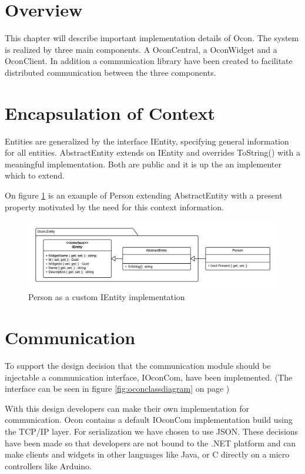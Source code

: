 \documentclass[../report.tex]{subfiles}
\begin{document}
\graphicspath{{img/}{../img/}}

\section{Overview}
This chapter will describe important implementation details of Ocon. The system is realized by three main components. A OconCentral, a OconWidget and a OconClient. In addition a communication library have been created to facilitate distributed communication between the three components.


\section{Encapsulation of Context}

Entities are generalized by the interface IEntity, specifying general information for all entities. AbstractEntity extends on IEntity and overrides ToString() with a meaningful implementation. Both are public and it is up the an implementer which to extend.

On figure \ref{fig:PersonImplementation} is an example of Person extending AbstractEntity with a present property motivated by the need for this context information.


\begin{figure}[H]
\includegraphics[width=\linewidth]{customEntityClass.png}
\caption{Person as a custom IEntity implementation}
\label{fig:PersonImplementation}
\end{figure}


\section{Communication}

To support the design decision that the communication module should be injectable a communication interface, IOconCom, have been implemented. (The interface can be seen in figure \ref{fig:oconclassdiagram} on page \pageref{fig:oconclassdiagram})

With this design developers can make their own implementation for communication. Ocon contains a default IOconCom implementation build using the TCP/IP layer. For serialization we have chosen to use JSON. These decisions have been made so that developers are not bound to the .NET platform and can make clients and widgets in other languages like Java, or C directly on a micro controllers like Arduino.
\end{document}
